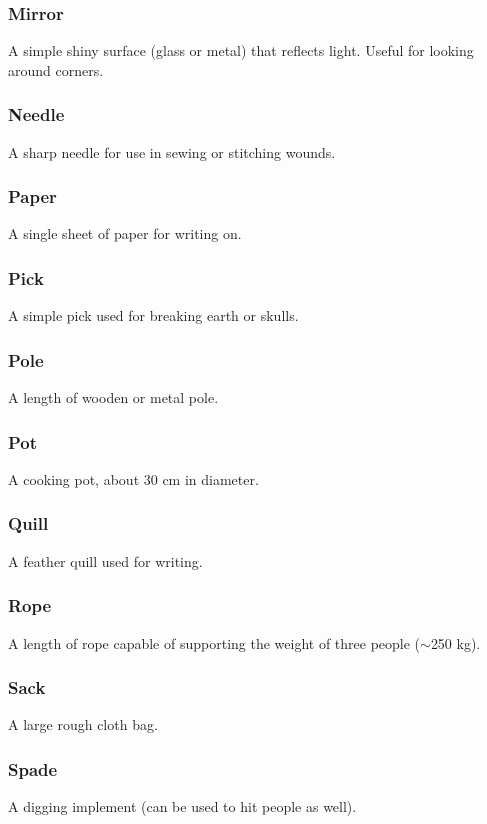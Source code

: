 \documentclass[a4paper,11pt,oneside]{book}
\begin{document}
\subsubsection{Mirror}
A simple shiny surface (glass or metal) that reflects light. Useful for looking around corners.

\subsubsection{Needle}
A sharp needle for use in sewing or stitching wounds.

\subsubsection{Paper}
A single sheet of paper for writing on.

\subsubsection{Pick}
A simple pick used for breaking earth or skulls.

\subsubsection{Pole}
A length of wooden or metal pole.

\subsubsection{Pot}
A cooking pot, about 30 cm in diameter.

\subsubsection{Quill}
A feather quill used for writing.

\subsubsection{Rope}
A length of rope capable of supporting the weight of three people ($\sim$250 kg).

\subsubsection{Sack}
A large rough cloth bag.

\subsubsection{Spade}
A digging implement (can be used to hit people as well).
\end{document}
